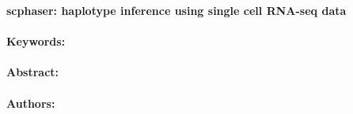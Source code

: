 \noindent
\large {\bf scphaser: haplotype inference using single cell RNA-seq data} 


\normalsize 


\noindent \paragraph{Keywords:} 

\noindent \paragraph{Abstract:} 



\noindent \paragraph{Authors:} 

